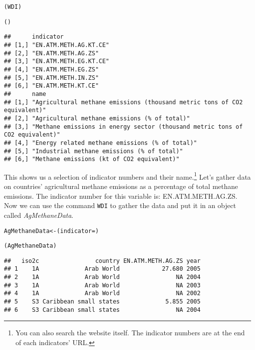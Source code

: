 {\scriptsize
\begin{knitrout}
\color{fgcolor}\begin{kframe}
\begin{alltt}
(WDI)

()
\end{alltt}
\begin{verbatim}
##      indicator             
## [1,] "EN.ATM.METH.AG.KT.CE"
## [2,] "EN.ATM.METH.AG.ZS"   
## [3,] "EN.ATM.METH.EG.KT.CE"
## [4,] "EN.ATM.METH.EG.ZS"   
## [5,] "EN.ATM.METH.IN.ZS"   
## [6,] "EN.ATM.METH.KT.CE"   
##      name                                                                         
## [1,] "Agricultural methane emissions (thousand metric tons of CO2 equivalent)"    
## [2,] "Agricultural methane emissions (% of total)"                                
## [3,] "Methane emissions in energy sector (thousand metric tons of CO2 equivalent)"
## [4,] "Energy related methane emissions (% of total)"                              
## [5,] "Industrial methane emissions (% of total)"                                  
## [6,] "Methane emissions (kt of CO2 equivalent)"
\end{verbatim}
\end{kframe}
\end{knitrout}

}

\noindent This shows us a selection of indicator numbers and their name.\footnote{You can also search the website itself. The indicator numbers are at the end of each indicators' URL.} Let's gather data on countries' agricultural methane emissions as a percentage of total methane emissions. The indicator number for this variable is: EN.ATM.METH.AG.ZS. Now we can use the command \texttt{WDI} to gather the data and put it in an object called \emph{AgMethaneData}.

\begin{knitrout}
\color{fgcolor}\begin{kframe}
\begin{alltt}
AgMethaneData <- (indicator = )

(AgMethaneData)
\end{alltt}
\begin{verbatim}
##   iso2c                country EN.ATM.METH.AG.ZS year
## 1    1A             Arab World            27.680 2005
## 2    1A             Arab World                NA 2004
## 3    1A             Arab World                NA 2003
## 4    1A             Arab World                NA 2002
## 5    S3 Caribbean small states             5.855 2005
## 6    S3 Caribbean small states                NA 2004
\end{verbatim}
\end{kframe}
\end{knitrout}


